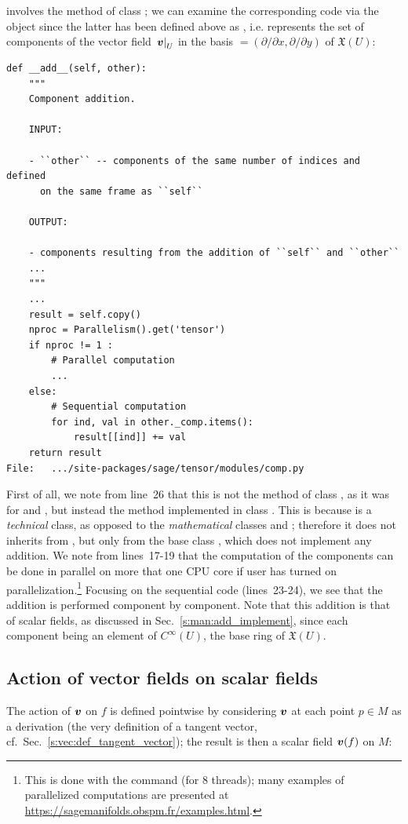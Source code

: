 involves the method  of class ; we
can examine the corresponding code via the object  since the
latter has been defined above as , i.e.
 represents the set of components of the vector field
$\left. \bm{v}\right| _U$ in the basis  $=(\partial/\partial x, \partial/\partial y)$
of $\mathfrak{X}(U)$:
\begin{lstlisting}
def __add__(self, other):
    """
    Component addition.

    INPUT:

    - ``other`` -- components of the same number of indices and defined
      on the same frame as ``self``

    OUTPUT:

    - components resulting from the addition of ``self`` and ``other``
    ...
    """
    ...
    result = self.copy()
    nproc = Parallelism().get('tensor')
    if nproc != 1 :
        # Parallel computation
        ...
    else:
        # Sequential computation
        for ind, val in other._comp.items():
            result[[ind]] += val
    return result
File:   .../site-packages/sage/tensor/modules/comp.py
\end{lstlisting}
First of all, we note from line~26
that this is not the method  of class ,
as it was for  and ,
but instead the method  implemented
in class . This is because  is a
\emph{technical} class, as opposed to the \emph{mathematical} classes
 and ; therefore it does not
inherits from , but only from the base class ,
which does not implement any addition.
We note from lines~17-19
that the computation of the components can be done in parallel on more that one CPU core if user has turned on parallelization.\footnote{This is done with the command
 (for 8 threads); many examples of
parallelized computations are presented at
\url{https://sagemanifolds.obspm.fr/examples.html}.}
Focusing on the sequential code (lines~23-24), we see that the addition is
performed component by component.
Note that this addition is that
of scalar fields, as discussed in Sec.~\ref{s:man:add_implement},
since each component being an element of $C^\infty(U)$, the base ring of $\mathfrak{X}(U)$.

\subsection{Action of vector fields on scalar fields} \label{s:vec:action_on_scalar}

The action of $\bm{v}$ on $f$ is defined pointwise by
considering $\bm{v}$ at each point $p\in M$ as a derivation (the very definition of a tangent vector,
cf.\ Sec.~\ref{s:vec:def_tangent_vector}); the result is then a scalar field $\bm{v}(f)$ on $M$:

